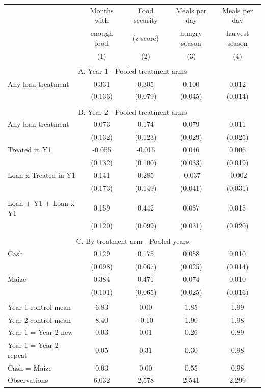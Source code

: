 \begin{tabular}{l cc cc}
\hline
 & Months with & Food security & Meals per day & Meals per day \\ 
 & enough food & (z-score) & hungry season & harvest season \\ 
 & (1) & (2) & (3) & (4) \\ 
\hline
 \\ 
\multicolumn{5}{c}{A. Year 1 - Pooled treatment arms} \\ 
Any loan treatment & 0.331 & 0.305 & 0.100 & 0.012 \\
 & (0.133) & (0.079) & (0.045) & (0.014) \\
 \\ 
\multicolumn{5}{c}{B. Year 2 - Pooled treatment arms} \\ 
Any loan treatment & 0.073 & 0.174 & 0.079 & 0.011 \\
 & (0.132) & (0.123) & (0.029) & (0.025) \\
Treated in Y1 & -0.055 & -0.016 & 0.046 & 0.006 \\
 & (0.132) & (0.100) & (0.033) & (0.019) \\
Loan x Treated in Y1 & 0.141 & 0.285 & -0.037 & -0.002 \\
 & (0.173) & (0.149) & (0.041) & (0.031) \\
 \\ 
Loan + Y1 + Loan x Y1 & 0.159 & 0.442 & 0.087 & 0.015 \\
 & (0.120) & (0.099) & (0.031) & (0.020) \\
 \\ 
\multicolumn{5}{c}{C. By treatment arm - Pooled years} \\ 
Cash & 0.129 & 0.175 & 0.058 & 0.010 \\
 & (0.098) & (0.067) & (0.025) & (0.014) \\
Maize & 0.384 & 0.471 & 0.074 & 0.010 \\
 & (0.101) & (0.065) & (0.025) & (0.016) \\
 \\ 
\hline
Year 1 control mean & 6.83 & 0.00 & 1.85 & 1.99 \\
Year 2 control mean & 8.40 & -0.10 & 1.90 & 1.98 \\
Year 1 = Year 2 new & 0.03 & 0.01 & 0.26 & 0.89 \\
Year 1 = Year 2 repeat & 0.05 & 0.31 & 0.30 & 0.98 \\
Cash = Maize & 0.03 & 0.00 & 0.55 & 0.98 \\
Observations &     6,032 &     2,578 &     2,541 &     2,299 \\
\hline
\end{tabular}
